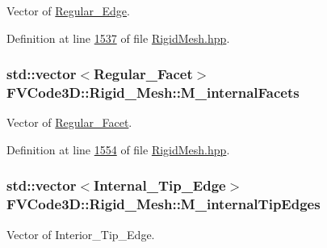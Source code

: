 Vector of \hyperlink{classFVCode3D_1_1Rigid__Mesh_1_1Regular__Edge}{Regular\+\_\+\+Edge}. 



Definition at line \hyperlink{RigidMesh_8hpp_source_l01537}{1537} of file \hyperlink{RigidMesh_8hpp_source}{Rigid\+Mesh.\+hpp}.

\subsubsection[{\texorpdfstring{M\+\_\+internal\+Facets}{M_internalFacets}}]{\setlength{\rightskip}{0pt plus 5cm}std\+::vector$<${\bf Regular\+\_\+\+Facet}$>$ F\+V\+Code3\+D\+::\+Rigid\+\_\+\+Mesh\+::\+M\+\_\+internal\+Facets\hspace{0.3cm}{\ttfamily [protected]}}\hypertarget{classFVCode3D_1_1Rigid__Mesh_a8ede7966973fec708327b95fc379a4e1}{}\label{classFVCode3D_1_1Rigid__Mesh_a8ede7966973fec708327b95fc379a4e1}


Vector of \hyperlink{classFVCode3D_1_1Rigid__Mesh_1_1Regular__Facet}{Regular\+\_\+\+Facet}. 



Definition at line \hyperlink{RigidMesh_8hpp_source_l01554}{1554} of file \hyperlink{RigidMesh_8hpp_source}{Rigid\+Mesh.\+hpp}.

\subsubsection[{\texorpdfstring{M\+\_\+internal\+Tip\+Edges}{M_internalTipEdges}}]{\setlength{\rightskip}{0pt plus 5cm}std\+::vector$<${\bf Internal\+\_\+\+Tip\+\_\+\+Edge}$>$ F\+V\+Code3\+D\+::\+Rigid\+\_\+\+Mesh\+::\+M\+\_\+internal\+Tip\+Edges\hspace{0.3cm}{\ttfamily [protected]}}\hypertarget{classFVCode3D_1_1Rigid__Mesh_a15cb042bfb5d94c4ce34f20d1e92ebb5}{}\label{classFVCode3D_1_1Rigid__Mesh_a15cb042bfb5d94c4ce34f20d1e92ebb5}


Vector of Interior\+\_\+\+Tip\+\_\+\+Edge. 




